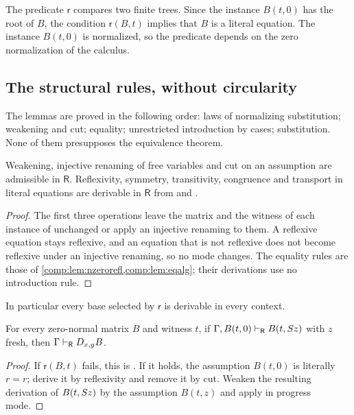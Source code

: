 The predicate $\mathsf{r}$ compares two finite trees. Since the instance
$B(t,0)$ has the root of $B$, the condition $\mathsf{r}(B,t)$ implies that
$B$ is a literal equation. The instance $B(t,0)$ is normalized, so the
predicate depends on the zero normalization of the calculus.

\subsection{The structural rules, without circularity}

The lemmas are proved in the following order: laws of normalizing
substitution; weakening and cut; equality; unrestricted introduction by
cases; substitution. None of them presupposes the equivalence theorem.

\begin{lemma}
\label{comp:lem:rstruct}
Weakening, injective renaming of free variables and cut on an assumption are
admissible in $\mathsf{R}$. Reflexivity, symmetry, transitivity, congruence
and transport in literal equations are derivable in $\mathsf{R}$ from
 and .
\end{lemma}

\begin{proof}
The first three operations leave the matrix and the witness of each
instance of  unchanged or apply an injective renaming to them.
A reflexive equation stays reflexive, and an equation that is not reflexive
does not become reflexive under an injective renaming, so no mode changes.
The equality rules are those of \cref{comp:lem:nzerorefl,comp:lem:eqalg};
their derivations use no introduction rule.
\end{proof}

In particular every base selected by $\mathsf{r}$ is derivable in every
context.

\begin{lemma}
\label{comp:lem:rcases}
For every zero-normal matrix $B$ and witness $t$, if
$\Gamma,B(t,0)\vdash_{\mathsf R}B(t,S z)$ with $z$ fresh, then
$\Gamma\vdash_{\mathsf R}D_{x,y}B$.
\end{lemma}

\begin{proof}
If $\mathsf{r}(B,t)$ fails, this is . If it holds, the
assumption $B(t,0)$ is literally $r=r$; derive it by reflexivity and remove
it by cut. Weaken the resulting derivation of $B(t,S z)$ by the
assumption $B(t,z)$ and apply  in progress mode.
\end{proof}

